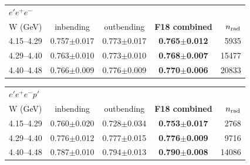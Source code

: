\begin{tabular}{lcccr}\toprule
\multicolumn{5}{l}{$e'e^+e^-$}\\
W (GeV) & inbending & outbending & \textbf{F18 combined} & $n_{\rm rad}$ \\\midrule
4.15--4.29 & 0.757$\pm$0.017 & 0.773$\pm$0.017 & \textbf{0.765$\pm$0.012} & 5935 \\
4.29--4.40 & 0.763$\pm$0.010 & 0.773$\pm$0.010 & \textbf{0.768$\pm$0.007} & 15477 \\
4.40--4.48 & 0.766$\pm$0.009 & 0.776$\pm$0.009 & \textbf{0.770$\pm$0.006} & 20833 \\
\bottomrule\end{tabular}

\medskip

\begin{tabular}{lcccr}\toprule
\multicolumn{5}{l}{$e'e^+e^-p'$}\\
W (GeV) & inbending & outbending & \textbf{F18 combined} & $n_{\rm rad}$ \\\midrule
4.15--4.29 & 0.760$\pm$0.020 & 0.728$\pm$0.034 & \textbf{0.753$\pm$0.017} & 2768 \\
4.29--4.40 & 0.776$\pm$0.012 & 0.777$\pm$0.015 & \textbf{0.776$\pm$0.009} & 9716 \\
4.40--4.48 & 0.787$\pm$0.010 & 0.794$\pm$0.013 & \textbf{0.790$\pm$0.008} & 14086 \\
\bottomrule\end{tabular}

\medskip

